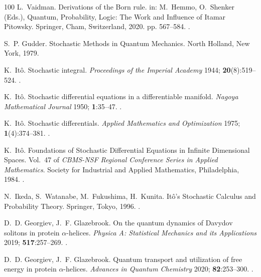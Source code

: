 \documentclass{ws-ijmpb}
\begin{document}
\begin{thebibliography}{100}
L.~Vaidman. Derivations of the {B}orn rule. in: M.~Hemmo, O.~Shenker (Eds.),
  Quantum, Probability, Logic: The Work and Influence of Itamar Pitowsky.
  Springer, Cham, Switzerland, 2020. pp. 567--584.
\newblock \href {http://doi.org/10.1007/978-3-030-34316-3_26}
  {}.

S.~P. Gudder. Stochastic Methods in Quantum Mechanics. North Holland, New York,
  1979.

K.~It\^{o}. Stochastic integral. \emph{Proceedings of the Imperial Academy}
  1944; \textbf{20}(8):519--524.
\newblock \href {http://doi.org/10.3792/pia/1195572786}
  {}.

K.~It\^{o}. Stochastic differential equations in a differentiable manifold.
  \emph{Nagoya Mathematical Journal} 1950; \textbf{1}:35--47.
\newblock \href {http://doi.org/10.1017/S0027763000022819}
  {}.

K.~It\^{o}. Stochastic differentials. \emph{Applied Mathematics and
  Optimization} 1975; \textbf{1}(4):374--381.
\newblock \href {http://doi.org/10.1007/bf01447959}
  {}.

K.~It\^{o}. Foundations of Stochastic Differential Equations in Infinite
  Dimensional Spaces. Vol.~47 of \emph{CBMS-NSF Regional Conference Series in
  Applied Mathematics}. Society for Industrial and Applied Mathematics,
  Philadelphia, 1984.
\newblock \href {http://doi.org/10.1137/1.9781611970234}
  {}.

N.~Ikeda, S.~Watanabe, M.~Fukushima, H.~Kunita. It\^{o}'s Stochastic Calculus
  and Probability Theory. Springer, Tokyo, 1996.
\newblock \href {http://doi.org/10.1007/978-4-431-68532-6}
  {}.

D.~D. Georgiev, J.~F. Glazebrook. On the quantum dynamics of {D}avydov solitons
  in protein $\alpha$-helices. \emph{Physica A: Statistical Mechanics and its
  Applications} 2019; \textbf{517}:257--269.
\newblock \href {http://doi.org/10.1016/j.physa.2018.11.026}
  {}.

D.~D. Georgiev, J.~F. Glazebrook. Quantum transport and utilization of free
  energy in protein $\alpha$-helices. \emph{Advances in Quantum Chemistry}
  2020; \textbf{82}:253--300.
\newblock \href {http://doi.org/10.1016/bs.aiq.2020.02.001}
  {}.


\end{thebibliography}
\end{document}
